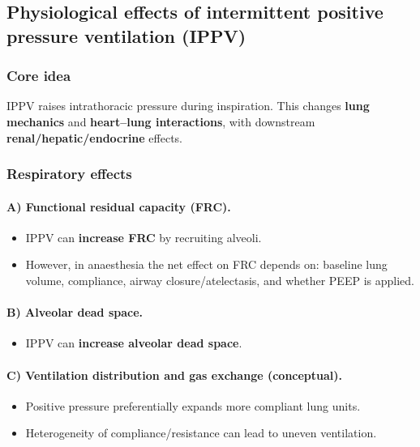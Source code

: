 \documentclass[11pt,a4paper]{article}
\begin{document}
\subsection{Physiological effects of intermittent positive pressure ventilation (IPPV)}

\subsubsection{Core idea}
IPPV raises intrathoracic pressure during inspiration. This changes \textbf{lung mechanics} and \textbf{heart--lung interactions}, with downstream \textbf{renal/hepatic/endocrine} effects.

\subsubsection{Respiratory effects}

\paragraph{A) Functional residual capacity (FRC).}
\begin{itemize}
  \item IPPV can \textbf{increase FRC} by recruiting alveoli.
  \item However, in anaesthesia the net effect on FRC depends on: baseline lung volume, compliance, airway closure/atelectasis, and whether PEEP is applied.
\end{itemize}

\paragraph{B) Alveolar dead space.}
\begin{itemize}
  \item IPPV can \textbf{increase alveolar dead space}.
\end{itemize}

\paragraph{C) Ventilation distribution and gas exchange (conceptual).}
\begin{itemize}
  \item Positive pressure preferentially expands more compliant lung units.
  \item Heterogeneity of compliance/resistance can lead to uneven ventilation.
\end{itemize}
\end{document}
